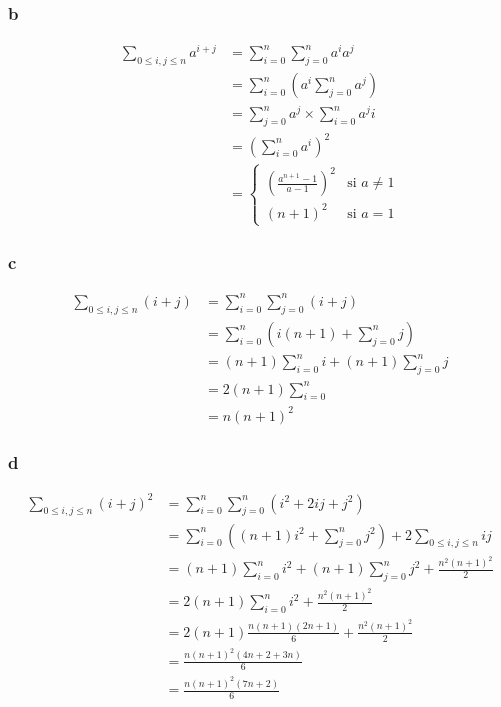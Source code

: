 \documentclass{report}
\begin{document}
\subsubsection*{b}
\begin{equation*}
	\begin{split}
		\sum_{0 \le i,j \le n} a^{i+j} &= \sum_{i=0}^{n} \sum_{j=0}^{n} a^i a^j \\
			&= \sum_{i=0}^{n} \left(a^i \sum_{j=0}^{n} a^j \right)\\
			&= \sum_{j=0}^{n} a^j \times \sum_{i=0}^{n} a^ji \\
			&= \left(\sum_{i=0}^{n} a^i \right)^2 \\
			&= \begin{cases}
				\left(\frac{a^{n+1}-1}{a-1}\right)^2 & \text{si $a\neq 1$}\\
				(n+1)^2                                  & \text{si $a= 1$}
				\end{cases}          
	\end{split}
\end{equation*}

\subsubsection*{c}
\begin{equation*}
	\begin{split}
		\sum_{0 \le i,j \le n} (i+j) &= \sum_{i=0}^{n} \sum_{j=0}^{n} (i+j) \\
		&= \sum_{i=0}^{n} \left(i(n+1) + \sum_{j=0}^{n} j \right)\\
		&= (n+1) \sum_{i=0}^{n} i + (n+1)\sum_{j=0}^{n} j  \\
		&= 2(n+1) \sum_{i=0}^{n} \\
		&= n(n+1)^2
	\end{split}
\end{equation*}

\subsubsection*{d}
\begin{equation*}
	\begin{split}
		\sum_{0 \le i,j \le n} (i+j)^2 &= \sum_{i=0}^{n} \sum_{j=0}^{n} (i^2+2ij+j^2) \\
		&= \sum_{i=0}^{n} \left((n+1)i^2 + \sum_{j=0}^{n} j^2 \right) + 2\sum_{0 \le i,j \le n} ij\\
		&= (n+1) \sum_{i=0}^{n} i^2 + (n+1)\sum_{j=0}^{n} j^2 + \frac{n^2(n+1)^2}{2}  \\
		&= 2(n+1) \sum_{i=0}^{n} i^2 + \frac{n^2(n+1)^2}{2} \\
		&= 2(n+1)\frac{n(n+1)(2n+1)}{6} + \frac{n^2(n+1)^2}{2} \\
		&= \frac{n(n+1)^2(4n+2+3n)}{6} \\
		&= \frac{n(n+1)^2(7n+2)}{6}
	\end{split}
\end{equation*}
\end{document}
